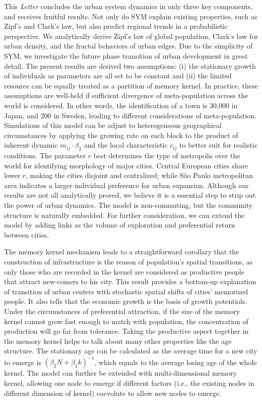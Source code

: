 \documentclass[reprint,unsortedaddress,amsmath,amssymb,aps,prl,showkeys]{revtex4-2}
\begin{document}
This \emph{Letter} concludes the urban system dynamics in only three key components, and receives fruitful results. Not only do SYM explain existing properties, such as Zipf's and Clark's law, but also predict regional trends in a probabilistic perspective. We analytically derive 
Zipf's law of global population, Clark's law for urban density, and the fractal behaviors of urban edges. Due to the simplicity of SYM, we investigate the future phase transition of urban development in great detail. The present results are derived two assumptions: (i) the stationary growth of individuals as parameters are all set to be constant and (ii) the limited resource can be equally treated as a partition of memory kernel. In practice, these assumptions are well-held if sufficient divergence of meta-population across the world is considered. In other words, the identification of a town is 30,000 in Japan, and 200 in Sweden, leading to different considerations of meta-population. Simulations of this model can be adjust to heterogeneous geographical circumstances by applying the growing rate on each block to the product of inherent dynamic $m_{ij}\cdot \beta_2$ and the local characteristic $c_{ij}$ to better suit for realistic conditions. The parameter $r$ best determines the type of metropolis over the world for identifying morphology of major cities. Central European cities share lower $r$, making the cities disjoint and centralized; while São Paulo metropolitan area indicates a larger individual preference for urban expansion. Although our results are not all analytically proved, we believe it is a essential step to strip out the power of urban dynamics. The model is non-commuting, but the community structure is naturally embedded. For further consideration, we can extend the model by adding links as the volume of exploration and preferential return between cities\cite{WANG2019121921}.

The memory kernel mechanism leads to a straightforward corollary that the construction of infrastructure is the reason of population's spatial transitions, as only those who are recorded in the kernel are considered as productive people that attract new-comers to his city. This result provides a bottom-up explanation of transition of urban centers with stochastic spatial shifts of cities' memorized people. It also tells that the economic growth is the basis of growth potentials. Under the circumstances of preferential attraction, if the size of the memory kernel cannot grow fast enough to match with population, the concentration of production will go far from tolerance. Taking the productive aspect together in the memory kernel helps to talk about many other properties like the age structure. The stationary age can be calculated as the average time for a new city to emerge is $(\beta_2 N + \beta_1 k)^{-1}$, which equals to the average losing age of the whole kernel. The model can further be extended with multi-dimensional memory kernel, allowing one node to emerge if different factors (i.e., the existing nodes in different dimension of kernel) coevolute to allow new nodes to emerge.%


\end{document}
